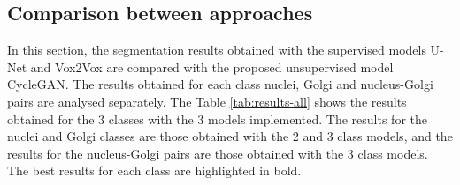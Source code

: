 \subsection{Comparison between approaches}

In this section, the segmentation results obtained with the supervised models U-Net and Vox2Vox are compared with the proposed unsupervised model CycleGAN. The results obtained for each class nuclei, Golgi and nucleus-Golgi pairs are analysed separately. The Table \ref{tab:results-all} shows the results obtained for the 3 classes with the 3 models implemented. The results for the nuclei and Golgi classes are those obtained with the 2 and 3 class models, and the results for the nucleus-Golgi pairs are those obtained with the 3 class models. The best results for each class are highlighted in bold.

